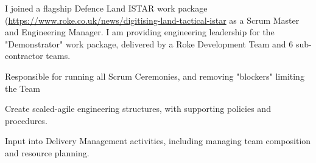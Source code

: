 {}
I joined a flagship Defence Land ISTAR work package (\href{Project ZODIAC)}{https://www.roke.co.uk/news/digitising-land-tactical-istar} as a Scrum Master and Engineering Manager. I am providing engineering leadership for the "Demonstrator" work package, delivered by a Roke Development Team and 6 sub-contractor teams.
\vspace{0.25em}
\begin{tightemize}
  \item Responsible for running all Scrum Ceremonies, and removing "blockers" limiting the Team
  \item Create scaled-agile engineering structures, with supporting policies and procedures.
  \item Input into Delivery Management activities, including managing team composition and resource planning.
\end{tightemize}
\sectionsep
